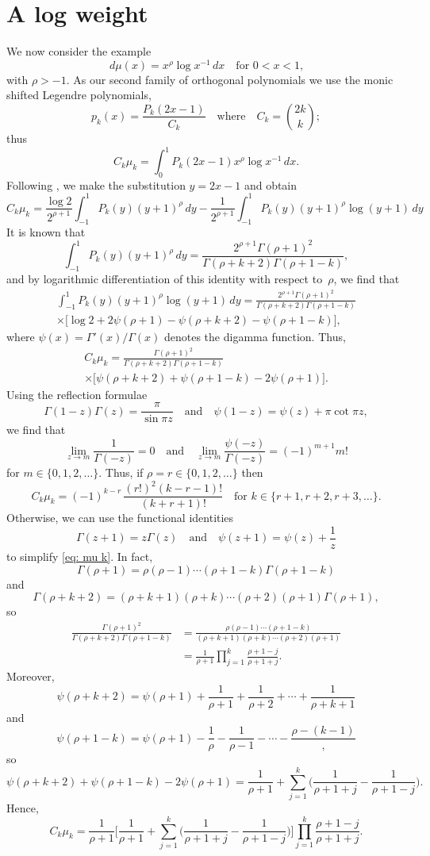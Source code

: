 \documentclass[12pt,a4paper]{article}
\begin{document}
\section{A log weight}
We now consider the example
\[
d\mu(x)=x^\rho\log x^{-1}\,dx\quad\text{for $0<x<1$,}
\]
with $\rho>-1$.  As our second family of orthogonal polynomials we 
use the monic shifted Legendre polynomials,
\[
p_k(x)=\frac{P_k(2x-1)}{C_k}
\quad\text{where}\quad
C_k=\binom{2k}{k};
\]
thus
\[
C_k\mu_k=\int_0^1 P_k(2x-1)x^\rho\log x^{-1}\,dx.
\]
Following \cite{Gautschi1979}, we make the substitution $y=2x-1$
and obtain
\[
C_k\mu_k=\frac{\log 2}{2^{\rho+1}}\int_{-1}^1 P_k(y)(y+1)^\rho\,dy
	-\frac{1}{2^{\rho+1}}\int_{-1}^1 
		P_k(y)(y+1)^\rho\log(y+1)\,dy
\]
It is known that
\[
\int_{-1}^1 P_k(y)(y+1)^\rho\,dy
	=\frac{2^{\rho+1}\Gamma(\rho+1)^2}%
{\Gamma(\rho+k+2)\Gamma(\rho+1-k)},
\]
and by logarithmic differentiation of this identity with respect 
to~$\rho$, we find that
\begin{multline*}
\int_{-1}^1 P_k(y)(y+1)^\rho\log(y+1)\,dy
	=\frac{2^{\rho+1}\Gamma(\rho+1)^2}%
{\Gamma(\rho+k+2)\Gamma(\rho+1-k)}\\
	\times\bigl[\log2+2\psi(\rho+1)-\psi(\rho+k+2)-\psi(\rho+1-k)
	\bigr],
\end{multline*}
where $\psi(x)=\Gamma'(x)/\Gamma(x)$ denotes the digamma function.
Thus,
\begin{multline}\label{eq: mu k}
C_k\mu_k=\frac{\Gamma(\rho+1)^2}{\Gamma(\rho+k+2)\Gamma(\rho+1-k)}\\
	\times\bigl[\psi(\rho+k+2)+\psi(\rho+1-k)-2\psi(\rho+1)\bigr].
\end{multline}
Using the reflection formulae
\[
\Gamma(1-z)\Gamma(z)=\frac{\pi}{\sin\pi z}
\quad\text{and}\quad
\psi(1-z)=\psi(z)+\pi\cot\pi z,
\]
we find that
\[
\lim_{z\to m}\frac{1}{\Gamma(-z)}=0
\quad\text{and}\quad
\lim_{z\to m}\frac{\psi(-z)}{\Gamma(-z)}=(-1)^{m+1}m!
\]
for $m\in\{0,1,2,\dots\}$.  Thus, if $\rho=r\in\{0,1,2,\dots\}$
then
\[
C_k\mu_k=(-1)^{k-r}\,\frac{(r!)^2(k-r-1)!}{(k+r+1)!}
	\quad\text{for $k\in\{r+1, r+2, r+3, \dots\}$.}
\]
Otherwise, we can use the functional identities
\[
\Gamma(z+1)=z\Gamma(z)\quad\text{and}\quad
\psi(z+1)=\psi(z)+\frac{1}{z}
\]
to simplify \eqref{eq: mu k}.  In fact,
\[
\Gamma(\rho+1)=\rho(\rho-1)\cdots(\rho+1-k)\Gamma(\rho+1-k)
\]
and
\[
\Gamma(\rho+k+2)=(\rho+k+1)(\rho+k)\cdots(\rho+2)(\rho+1)
	\Gamma(\rho+1),
\]
so
\begin{align*}
\frac{\Gamma(\rho+1)^2}{\Gamma(\rho+k+2)\Gamma(\rho+1-k)}
	&=\frac{\rho(\rho-1)\cdots(\rho+1-k)}%
{(\rho+k+1)(\rho+k)\cdots(\rho+2)(\rho+1)}\\
	&=\frac{1}{\rho+1}\prod_{j=1}^k\frac{\rho+1-j}{\rho+1+j}.
\end{align*}
Moreover,
\[
\psi(\rho+k+2)=\psi(\rho+1)+\frac{1}{\rho+1}+\frac{1}{\rho+2}
	+\cdots+\frac{1}{\rho+k+1}
\]
and
\[
\psi(\rho+1-k)=\psi(\rho+1)-\frac{1}{\rho}-\frac{1}{\rho-1}
	-\cdots-\frac{\rho-(k-1)},
\]
so
\[
\psi(\rho+k+2)+\psi(\rho+1-k)-2\psi(\rho+1)
	=\frac{1}{\rho+1}+\sum_{j=1}^k\biggl(\frac{1}{\rho+1+j}
		-\frac{1}{\rho+1-j}\biggr).
\]
Hence,
\[
C_k\mu_k=\frac{1}{\rho+1}\biggl[\frac{1}{\rho+1}
	+\sum_{j=1}^k\biggl(\frac{1}{\rho+1+j}
		-\frac{1}{\rho+1-j}\biggr)\biggr]
	\prod_{j=1}^k\frac{\rho+1-j}{\rho+1+j}.
\]
\end{document}
